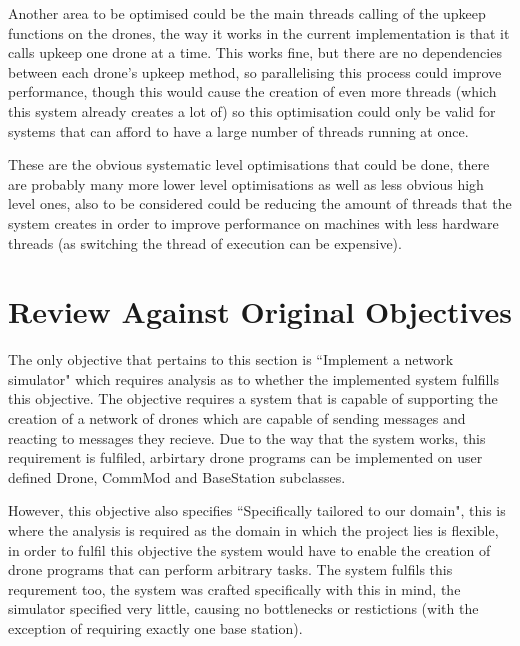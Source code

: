 	Another area to be optimised could be the main threads calling of the upkeep functions on the drones, the way it works
	in the current implementation is that it calls upkeep one drone at a time. This works fine, but there are no dependencies
	between each drone's upkeep method, so parallelising this process could improve performance, though this would cause the 
	creation of even more threads (which this system already creates a lot of) so this optimisation could only be valid for
	systems that can afford to have a large number of threads running at once.

	These are the obvious systematic level optimisations that could be done, there are probably many more lower level
	optimisations as well as less obvious high level ones, also to be considered could be reducing the amount of threads
	that the system creates in order to improve performance on machines with less hardware threads (as switching the thread
	of execution can be expensive).

\section{Review Against Original Objectives}
	The only objective that pertains to this section is ``Implement a network simulator" which requires analysis as to whether
	the implemented system fulfills this objective. The objective requires a system that is capable of supporting the creation 
	of a network of drones which are capable of sending messages and reacting to messages they recieve. Due to the way that the
	system works, this requirement is fulfiled, arbirtary drone programs can be implemented on user defined Drone, CommMod and
	BaseStation subclasses.

	However, this objective also specifies ``Specifically tailored to our domain", this is where the analysis is required as
	the domain in which the project lies is flexible, in order to fulfil this objective the system would have to enable the
	creation of drone programs that can perform arbitrary tasks. The system fulfils this requrement too, the system was crafted
	specifically with this in mind, the simulator specified very little, causing no bottlenecks or restictions (with the exception
	of requiring exactly one base station).

